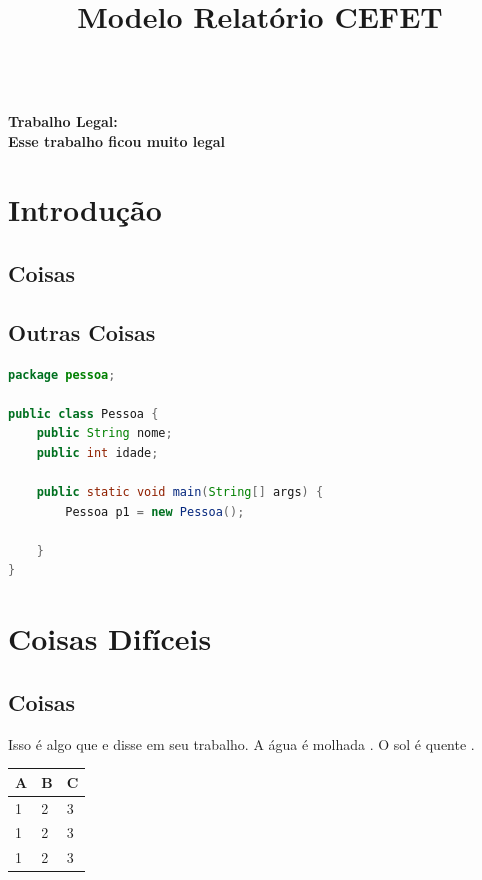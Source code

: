 \documentclass[12pt,a4paper]{article}
\newcommand{\CEFETtitulo}[1]{
\begin{center}
\begin{Large}
\textbf{\\#1\\}
\end{Large}
\end{center}
\vspace{.5cm}
}
\newcommand{\CEFETopen}{
    \selectlanguage{brazil}
    \pagestyle{otherpage}
    \thispagestyle{firstpage}
}
\begin{document}
	\title{Modelo Relatório CEFET}
	\CEFETopen
    \CEFETtitulo{Trabalho Legal:\\Esse trabalho ficou muito legal}


\section{Introdução}
\lipsum[1-2]
\subsection{Coisas}
\lipsum[1-2]

\vspace{.3cm}


\subsection{Outras Coisas}
\lipsum[1-2]

\begin{lstlisting}[language=Java, caption={},label={}]
package pessoa;

public class Pessoa {
    public String nome;
    public int idade;

    public static void main(String[] args) {
        Pessoa p1 = new Pessoa(); 
    
    }
}
\end{lstlisting}



\section{Coisas Difíceis}
\lipsum[1]
\subsection{Coisas}

Isso é algo que \citet{Liu2007494} e \citet{law} disse em seu trabalho. A água é molhada \citep{1987element}. O sol é quente \citep{1987element,Liu2007494,site_sparselib}.

\lipsum[1-2]


\begin{center}
\vspace{.3cm}
\begin{tabular}{|l|l|l|}
\hline
\textbf{A}&\textbf{B}&\textbf{C}\\ \hline \hline
1&2&3\\
1&2&3\\
1&2&3\\ \hline
\end{tabular}
\vspace{.3cm}
\end{center}
\end{document}
